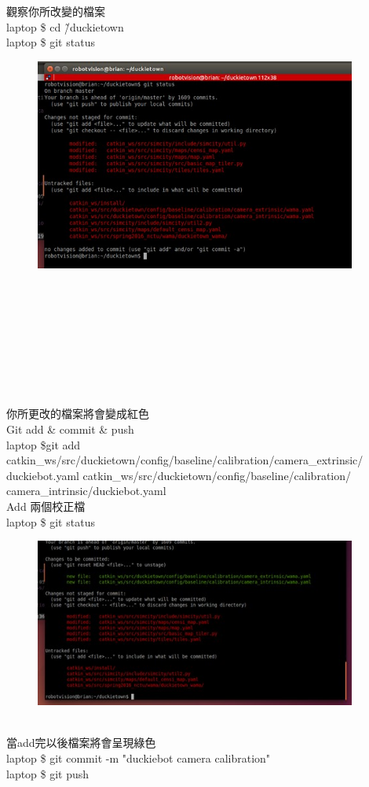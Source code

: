 \documentclass{article}
\begin{document}
觀察你所改變的檔案
\\laptop \$ cd \~/duckietown
\\laptop \$ git status
\\
\begin{figure}[htp]
    \begin{center}
        \includegraphics[width=300pt]{pic/圖片17.jpg}
    \end{center}
\end{figure}
\\\\\\\\\\\\\\\\
你所更改的檔案將會變成紅色
\\Git add \& commit \& push
\\laptop \$git add catkin\_ws/src/duckietown/config/baseline/calibration/camera\_extrinsic/ duckiebot.yaml catkin\_ws/src/duckietown/config/baseline/calibration/ camera\_intrinsic/duckiebot.yaml
\\Add 兩個校正檔
\\laptop \$ git status
\\
\begin{figure}[htp]
    \begin{center}
        \includegraphics[width=300pt]{pic/圖片18.jpg}
    \end{center}
\end{figure}
\\
當add完以後檔案將會呈現綠色
\\laptop \$ git commit -m "duckiebot camera calibration"
\\laptop \$ git push
\end{document}
